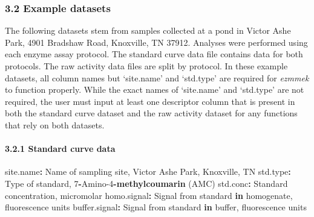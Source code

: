 \documentclass[
]{article}
\newenvironment{Shaded}{\begin{snugshade}}{\end{snugshade}}
\newcommand{\CommentTok}[1]{\textcolor[rgb]{0.56,0.35,0.01}{\textit{#1}}}
\newcommand{\ControlFlowTok}[1]{\textcolor[rgb]{0.13,0.29,0.53}{\textbf{#1}}}
\newcommand{\DecValTok}[1]{\textcolor[rgb]{0.00,0.00,0.81}{#1}}
\newcommand{\KeywordTok}[1]{\textcolor[rgb]{0.13,0.29,0.53}{\textbf{#1}}}
\newcommand{\NormalTok}[1]{#1}
\newcommand{\OperatorTok}[1]{\textcolor[rgb]{0.81,0.36,0.00}{\textbf{#1}}}
\newcommand{\StringTok}[1]{\textcolor[rgb]{0.31,0.60,0.02}{#1}}
\begin{document}
\hypertarget{example-datasets}{%
\subsubsection{3.2 Example datasets}\label{example-datasets}}

The following datasets stem from samples collected at a pond in Victor
Ashe Park, 4901 Bradshaw Road, Knoxville, TN 37912. Analyses were
performed using each enzyme assay protocol. The standard curve data file
contains data for both protocols. The raw activity data files are split
by protocol. In these example datasets, all column names but `site.name'
and `std.type' are required for \emph{ezmmek} to function properly.
While the exact names of `site.name' and `std.type' are not required,
the user must input at least one descriptor column that is present in
both the standard curve dataset and the raw activity dataset for any
functions that rely on both datasets.

\hypertarget{standard-curve-data}{%
\paragraph{3.2.1 Standard curve data}\label{standard-curve-data}}

\begin{Shaded}
\end{Shaded}

\begin{Shaded}
\begin{Highlighting}[]
\NormalTok{site.name}\OperatorTok{:}\StringTok{ }\NormalTok{Name of sampling site, Victor Ashe Park, Knoxville, TN}
\NormalTok{std.type}\OperatorTok{:}\StringTok{ }\NormalTok{Type of standard, }\DecValTok{7}\OperatorTok{{-}}\NormalTok{Amino}\DecValTok{{-}4}\OperatorTok{{-}}\KeywordTok{methylcoumarin}\NormalTok{ (AMC)}
\NormalTok{std.conc}\OperatorTok{:}\StringTok{ }\NormalTok{Standard concentration, micromolar}
\NormalTok{homo.signal}\OperatorTok{:}\StringTok{ }\NormalTok{Signal from standard }\ControlFlowTok{in}\NormalTok{ homogenate, fluorescence units}
\NormalTok{buffer.signal}\OperatorTok{:}\StringTok{ }\NormalTok{Signal from standard }\ControlFlowTok{in}\NormalTok{ buffer, fluorescence units}
\end{Highlighting}
\end{Shaded}
\end{document}
